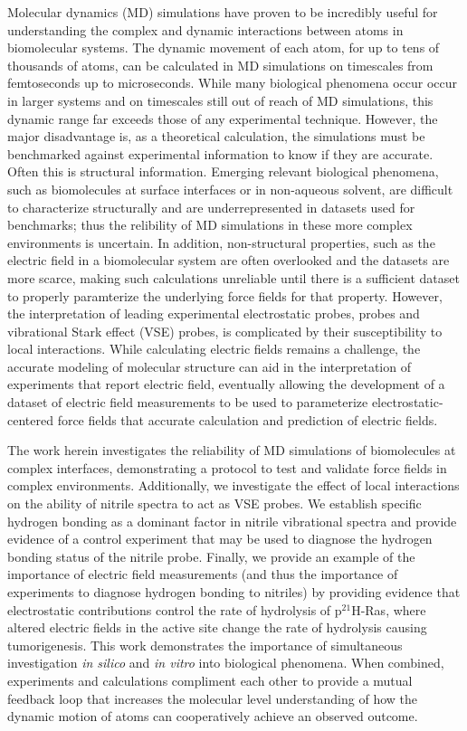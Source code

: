 Molecular dynamics (MD) simulations have proven to be incredibly useful for understanding the complex and dynamic interactions between atoms in biomolecular systems. 
The dynamic movement of each atom, for up to tens of thousands of atoms, can be calculated in MD simulations on timescales from femtoseconds up to microseconds. 
While many biological phenomena occur occur in larger systems and on timescales still out of reach of MD simulations, this dynamic range far exceeds those of any experimental technique. 
However, the major disadvantage is, as a theoretical calculation, the simulations must be benchmarked against experimental information to know if they are accurate. 
Often this is structural information.
Emerging relevant biological phenomena, such as biomolecules at surface interfaces or in non-aqueous solvent, are difficult to characterize structurally and are underrepresented in datasets used for benchmarks;
thus the relibility of MD simulations in these more complex environments is uncertain. 
In addition, non-structural properties, such as the electric field in a biomolecular system are often overlooked and the datasets are more scarce, making such calculations unreliable until there is a sufficient dataset to properly paramterize the underlying force fields for that property. 
However, the interpretation of leading experimental electrostatic probes, \pKa{} probes and vibrational Stark effect (VSE) probes, is complicated by their susceptibility to local interactions. 
While calculating electric fields remains a challenge, the accurate modeling of molecular structure can aid in the interpretation of experiments that report electric field, eventually allowing the development of a dataset of electric field measurements to be used to parameterize electrostatic-centered force fields that accurate calculation and prediction of electric fields. 

The work herein investigates the reliability of MD simulations of biomolecules at complex interfaces, demonstrating a protocol to test and validate force fields in complex environments. 
Additionally, we investigate the effect of local interactions on the ability of nitrile spectra to act as VSE probes. 
We establish specific hydrogen bonding as a dominant factor in nitrile vibrational spectra and provide evidence of a control experiment that may be used to diagnose the hydrogen bonding status of the nitrile probe. 
Finally, we provide an example of the importance of electric field measurements (and thus the importance of experiments to diagnose hydrogen bonding to nitriles) by providing evidence that electrostatic contributions control the rate of hydrolysis of p$^{21}$H-Ras, where altered electric fields in the active site change the rate of hydrolysis causing tumorigenesis. 
This work demonstrates the importance of simultaneous investigation \emph{in silico} and \emph{in vitro} into biological phenomena. 
When combined, experiments and calculations compliment each other to provide a mutual feedback loop that increases the molecular level understanding of how the dynamic motion of atoms can cooperatively achieve an observed outcome. 
